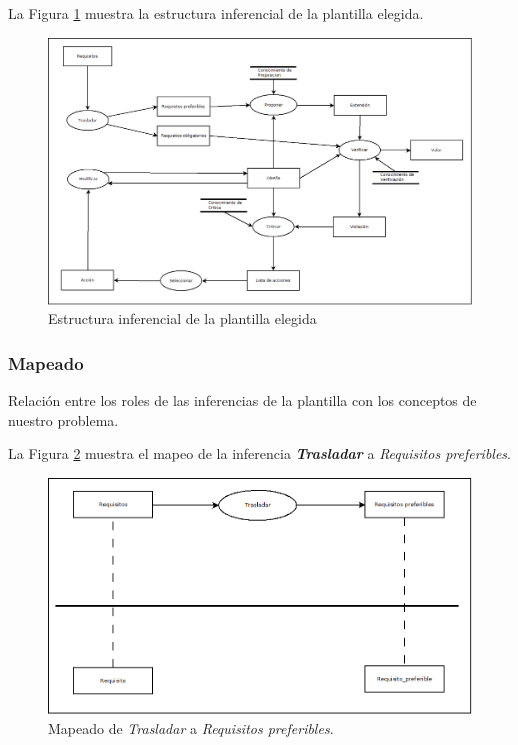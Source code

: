 La Figura \ref{fig:EstructuraInferencial} muestra la estructura inferencial de la plantilla elegida.
\begin{figure}[H]
  \centering
  \includegraphics[scale=0.30]{imaxes/PlantillaInferencial.png}
  \caption{\label{fig:EstructuraInferencial}Estructura inferencial de la plantilla elegida}
\end{figure}

\subsubsection{Mapeado}

Relación entre los roles de las inferencias de la plantilla con los conceptos de nuestro problema.

La Figura \ref{fig:TrasladarPreferibles} muestra el mapeo de la inferencia \textbf{\textit{Trasladar}} a \textit{Requisitos preferibles}.

\begin{figure}[H]
  \centering
  \includegraphics[scale=0.35]{imaxes/TrasladarPreferibles.png}
  \caption{\label{fig:TrasladarPreferibles}Mapeado de \textit{Trasladar} a \textit{Requisitos preferibles}.}
\end{figure}

